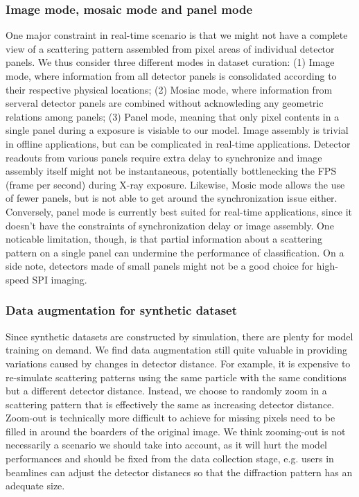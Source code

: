 \subsubsection{Image mode, mosaic mode and panel mode}

One major constraint in real-time scenario is that we might not have a complete
view of a scattering pattern assembled from pixel areas of individual detector
panels.  We thus consider three different modes in dataset curation: (1) Image
mode, where information from all detector panels is consolidated according to
their respective physical locations; (2) Mosiac mode, where information from
serveral detector panels are combined without acknowleding any geometric
relations among panels;  (3) Panel mode, meaning that only pixel contents in a
single panel during a exposure is visiable to our model.  Image assembly is
trivial in offline applications, but can be complicated in real-time
applications.  Detector readouts from various panels require extra delay to
synchronize and image assembly itself might not be instantaneous, potentially
bottlenecking the FPS (frame per second) during X-ray exposure. Likewise, Mosic
mode allows the use of fewer panels, but is not able to get around the
synchronization issue either.  Conversely, panel mode is currently best suited
for real-time applications, since it doesn't have the constraints of
synchronization delay or image assembly.  One noticable limitation, though, is
that partial information about a scattering pattern on a single panel can
undermine the performance of classification.  On a side note, detectors made of
small panels might not be a good choice for high-speed SPI imaging.  


\subsubsection{Data augmentation for synthetic dataset}


Since synthetic datasets are constructed by simulation, there are plenty for
model training on demand.  We find data augmentation still quite valuable in
providing variations caused by changes in detector distance.  For example, it is
expensive to re-simulate scattering patterns using the same particle with the
same conditions but a different detector distance.  Instead, we choose to
randomly zoom in a scattering pattern that is effectively the same as increasing
detector distance.  Zoom-out is technically more difficult to achieve for
missing pixels need to be filled in around the boarders of the original image.
We think zooming-out is not necessarily a scenario we should take into account,
as it will hurt the model performances and should be fixed from the data
collection stage, e.g. users in beamlines can adjust the detector distanecs so
that the diffraction pattern has an adequate size.  
